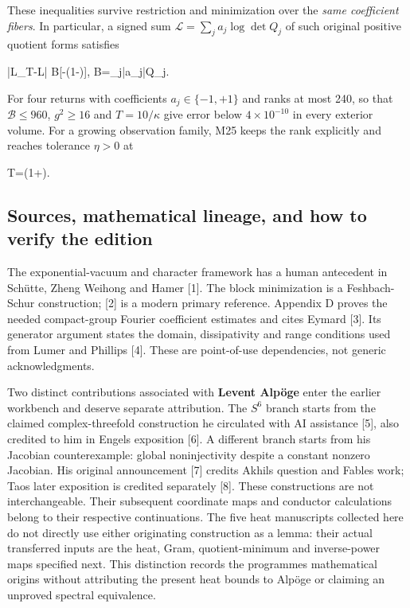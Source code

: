 \documentclass[11pt,a4paper]{article}
\renewcommand{\[}{\begingroup\small\originaldisplaystart}
\renewcommand{\]}{\originaldisplayend\endgroup}
\begin{document}
These inequalities survive restriction and minimization over the
\emph{same coefficient fibers}. In particular, a signed sum
\(\mathcal L=\sum_ja_j\log\det Q_j\) of such original positive quotient
forms satisfies

\[
|\mathcal L_T-\mathcal L|
\mathcal B[-\log(1-\varepsilon)],\qquad
\mathcal B=\sum_j|a_j|Q_j.
\]

For four returns with coefficients \(a_j\in\{-1,+1\}\) and ranks at most
240, so that \(\mathcal B\leq960\), \(g^2\geq16\) and \(T=10/\kappa\)
give error below \(4\times10^{-10}\) in every exterior volume. For a
growing observation family, M25 keeps the rank explicitly and reaches
tolerance \(\eta>0\) at

\[
T=\log\!\left(1+\right).
\]

\subsection{Sources, mathematical lineage, and how to verify the
edition}\label{sources-mathematical-lineage-and-how-to-verify-the-edition}

The exponential-vacuum and character framework has a human antecedent in
Schütte, Zheng Weihong and Hamer {[}1{]}. The block minimization is a
Feshbach-Schur construction; {[}2{]} is a modern primary reference.
Appendix D proves the needed compact-group Fourier coefficient estimates
and cites Eymard {[}3{]}. Its generator argument states the domain,
dissipativity and range conditions used from Lumer and Phillips {[}4{]}.
These are point-of-use dependencies, not generic acknowledgments.

Two distinct contributions associated with \textbf{Levent Alpöge} enter
the earlier workbench and deserve separate attribution. The \(S^6\)
branch starts from the claimed complex-threefold construction he
circulated with AI assistance {[}5{]}, also credited to him in
Engel\textquotesingle s exposition {[}6{]}. A different branch starts
from his Jacobian counterexample: global noninjectivity despite a
constant nonzero Jacobian. His original announcement {[}7{]} credits
Akhil\textquotesingle s question and Fable\textquotesingle s work;
Tao\textquotesingle s later exposition is credited separately {[}8{]}.
These constructions are not interchangeable. Their subsequent coordinate
maps and conductor calculations belong to their respective
continuations. The five heat manuscripts collected here do not directly
use either originating construction as a lemma: their actual transferred
inputs are the heat, Gram, quotient-minimum and inverse-power maps
specified next. This distinction records the programme\textquotesingle s
mathematical origins without attributing the present heat bounds to
Alpöge or claiming an unproved spectral equivalence.
\end{document}

